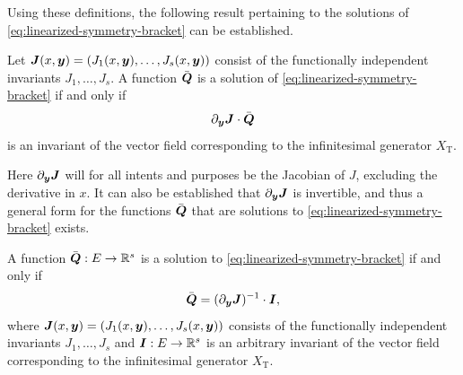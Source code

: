 Using these definitions, the following result pertaining to the solutions of \cref{eq:linearized-symmetry-bracket} can be established.
\begin{thm}
  Let \(\vect{J}(x, \vect{y}) = \left(J_1(x, \vect{y}), \dots, J_s(x, \vect{y})\right)\) consist of the functionally independent invariants \(J_1, \dots, J_s\).
  A function \(\bar{\boldsymbol{Q}}\) is a solution of \cref{eq:linearized-symmetry-bracket} if and only if
  \begin{equation*}
    \partial_{\boldsymbol{y}} \boldsymbol{J} \cdot \bar{\boldsymbol{Q}}
  \end{equation*}
  is an invariant of the vector field corresponding to the infinitesimal generator \(X_{\text{T}}\).
\end{thm}
Here \(\partial_{\boldsymbol{y}} \boldsymbol{J}\) will for all intents and purposes be the Jacobian of \(J\), excluding the derivative in \(x\).
It can also be established that \(\partial_{\boldsymbol{y}} \boldsymbol{J}\) is invertible, and thus a general form for the functions \(\bar{\boldsymbol{Q}}\) that are solutions to \cref{eq:linearized-symmetry-bracket} exists.
\begin{cor} \label{cor:reduced-characteristic-decomposition}
  A function \(\bar{\boldsymbol{Q}}: E \to \mathbb{R}^s\) is a solution to \cref{eq:linearized-symmetry-bracket} if and only if
  \begin{equation*}
    \bar{\boldsymbol{Q}} = (\partial_{\boldsymbol{y}} \boldsymbol{J})^{-1} \cdot \boldsymbol{I},
  \end{equation*}
  where \(\vect{J}(x, \vect{y}) = \left(J_1(x, \vect{y}), \dots, J_s(x, \vect{y})\right)\) consists of the functionally independent invariants \(J_1, \dots, J_s\) and \(\boldsymbol{I}: E \to \mathbb{R}^s\) is an arbitrary invariant of the vector field corresponding to the infinitesimal generator \(X_{\text{T}}\).
\end{cor}
